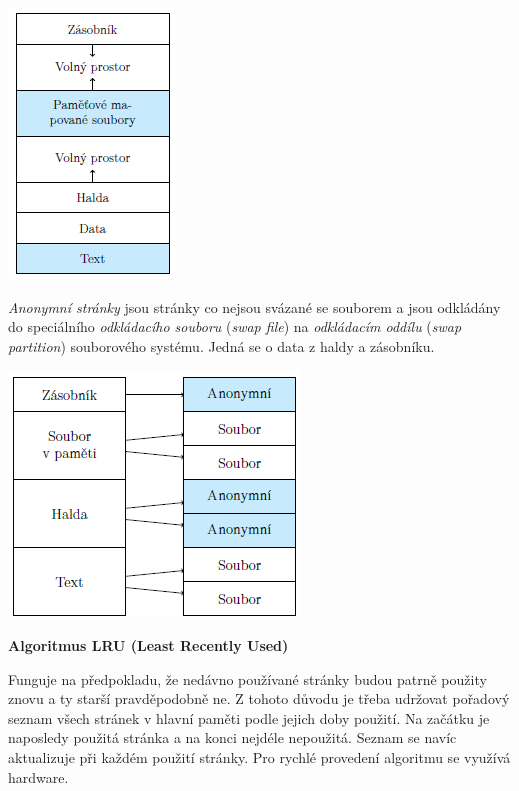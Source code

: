 \begin{center}
    \includegraphics[scale=1]{images/mem_page_file.png}
\end{center}

\textit{Anonymní stránky} jsou stránky co nejsou svázané se souborem a jsou odkládány do speciálního \textit{odkládacího souboru} (\textit{swap file}) na \textit{odkládacím oddílu} (\textit{swap partition}) souborového systému. Jedná se o data z haldy a zásobníku.

\begin{center}
    \includegraphics[scale=1]{images/mem_page_anon.png}
\end{center}

\begin{Large}
    \vspace{0,5cm}
    \textbf{Algoritmus LRU (Least Recently Used)}
\end{Large}

Funguje na předpokladu, že nedávno používané stránky budou patrně použity znovu a ty starší pravděpodobně ne. Z tohoto důvodu je třeba udržovat pořadový seznam všech stránek v hlavní paměti podle jejich doby použití. Na začátku je naposledy použitá stránka a na konci nejdéle nepoužitá. Seznam se navíc aktualizuje při každém použití stránky. Pro rychlé provedení algoritmu se využívá hardware.

